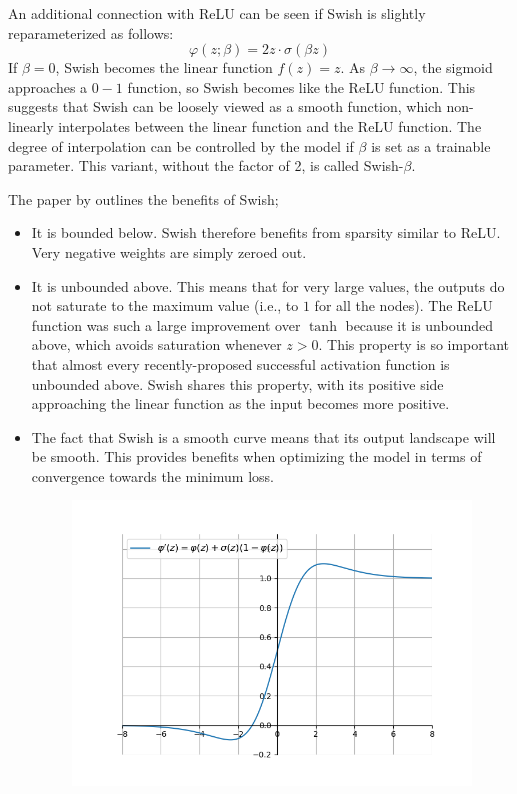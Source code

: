 \documentclass[12pt]{report}
\numberwithin{equation}{section}
\begin{document}
An additional connection with ReLU can be seen if Swish is slightly reparameterized as follows:
\[
\varphi(z;\beta) = 2z\cdot \sigma(\beta z)
\]
If $\beta= 0$, Swish becomes the linear function $f(z) = z$. As $\beta \rightarrow \infty$, the sigmoid approaches a $0-1$ function, so Swish becomes like the ReLU function. This suggests that Swish can be loosely viewed as a smooth function, which non-linearly interpolates between the linear function and the ReLU function. The degree of interpolation can be controlled by the model if $\beta$ is set as a trainable parameter. This variant, without the factor of 2, is called {Swish-$\beta$}.

The paper by {\cite{DBLP:journals/corr/abs-1710-05941}} outlines the benefits of Swish;
\begin{itemize}[label=-]
\item It is bounded below. Swish therefore benefits from sparsity similar to ReLU. Very negative weights are simply zeroed out.
\item It is unbounded above. This means that for very large values, the outputs do not saturate to the maximum value (i.e., to $1$ for all the nodes). The ReLU function was such a large improvement over $\tanh$ because it is unbounded above, which avoids saturation whenever $z > 0$. This property is so important that almost every recently-proposed successful activation function is unbounded above. Swish shares this property, with its positive side approaching the linear function as the input becomes more positive.
\item The fact that Swish is a smooth curve means that its output landscape will be smooth. This provides benefits when optimizing the model in terms of convergence towards the minimum loss.
\begin{figure}[htb!]
\centering 
\includegraphics[scale=0.9]{png/swish_prime.png} 

\end{figure}
\end{itemize}
\end{document}
